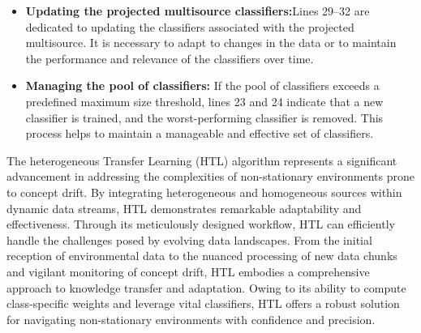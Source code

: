 \begin{itemize}
	\item \textbf{Updating the projected multisource classifiers:}Lines 29–32 are dedicated to updating the classifiers associated with the projected multisource. It is necessary to adapt to changes in the data or to maintain the performance and relevance of the classifiers over time.
	\item \textbf{Managing the pool of classifiers:} If the pool of classifiers exceeds a predefined maximum size threshold, lines 23 and 24 indicate that a new classifier is trained, and the worst-performing classifier is removed. This process helps to maintain a manageable and effective set of classifiers.
\end{itemize}
The heterogeneous Transfer Learning (HTL) algorithm represents a significant advancement in addressing the complexities of non-stationary environments prone to concept drift. By integrating heterogeneous and homogeneous sources within dynamic data streams, HTL demonstrates remarkable adaptability and effectiveness. Through its meticulously designed workflow, HTL can efficiently handle the challenges posed by evolving data landscapes. From the initial reception of environmental data to the nuanced processing of new data chunks and vigilant monitoring of concept drift, HTL embodies a comprehensive approach to knowledge transfer and adaptation. Owing to its ability to compute class-specific weights and leverage vital classifiers, HTL offers a robust solution for navigating non-stationary environments with confidence and precision.

